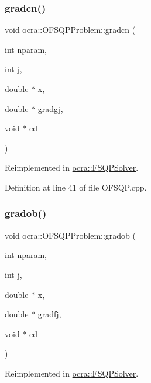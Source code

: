 \subsubsection{\texorpdfstring{gradcn()}{gradcn()}}
{\footnotesize\ttfamily void ocra\+::\+O\+F\+S\+Q\+P\+Problem\+::gradcn (\begin{DoxyParamCaption}\item[{int}]{nparam,  }\item[{int}]{j,  }\item[{double $\ast$}]{x,  }\item[{double $\ast$}]{gradgj,  }\item[{void $\ast$}]{cd }\end{DoxyParamCaption})\hspace{0.3cm}{\ttfamily [virtual]}}



Reimplemented in \hyperlink{classocra_1_1FSQPSolver_aea97ea5c3c2480976ad27c190b60077d}{ocra\+::\+F\+S\+Q\+P\+Solver}.



Definition at line 41 of file O\+F\+S\+Q\+P.\+cpp.

\hypertarget{classocra_1_1OFSQPProblem_a1300d237d9b87df1f71db7129c38458a}{}\label{classocra_1_1OFSQPProblem_a1300d237d9b87df1f71db7129c38458a} 
\subsubsection{\texorpdfstring{gradob()}{gradob()}}
{\footnotesize\ttfamily void ocra\+::\+O\+F\+S\+Q\+P\+Problem\+::gradob (\begin{DoxyParamCaption}\item[{int}]{nparam,  }\item[{int}]{j,  }\item[{double $\ast$}]{x,  }\item[{double $\ast$}]{gradfj,  }\item[{void $\ast$}]{cd }\end{DoxyParamCaption})\hspace{0.3cm}{\ttfamily [virtual]}}



Reimplemented in \hyperlink{classocra_1_1FSQPSolver_ac88cddc691c4bf9862f9d6f30599a098}{ocra\+::\+F\+S\+Q\+P\+Solver}.



